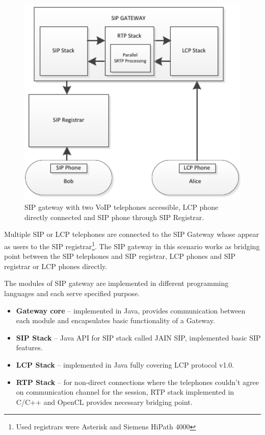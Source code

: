 \begin{figure}[h!]
\centering
\includegraphics[width=13cm]{fig/scenario1.pdf}
\caption{SIP gateway with two VoIP telephones accessible, LCP phone directly 
connected and SIP phone through SIP Registrar.}
\label{oclpm}
\end{figure}

Multiple SIP or LCP telephones are connected to the SIP Gateway whose appear as
users to the SIP registrar\footnote{ Used registrars were Asterisk and Siemens 
HiPath 4000}. The SIP gateway in this scenario works as bridging point between 
the SIP telephones and SIP registrar, LCP phones and SIP registrar or LCP phones
directly.

The modules of SIP gateway are implemented in different programming languages
and each serve specified purpose.
\begin{itemize}
\item \textbf{Gateway core} -- implemented in Java, provides communication 
between each module and encapsulates basic functionality of a Gateway.
\item \textbf{SIP Stack} -- Java API for SIP stack called 
JAIN SIP\cite{jainsip}, implemented basic SIP features.
\item \textbf{LCP Stack} -- implemented in Java fully covering LCP protocol 
v1.0.
\item \textbf{RTP Stack} -- for non-direct connections where the telephones 
couldn't agree on communication channel for the session, RTP stack implemented
in C/C++ and OpenCL provides necessary bridging point.
\end{itemize}

